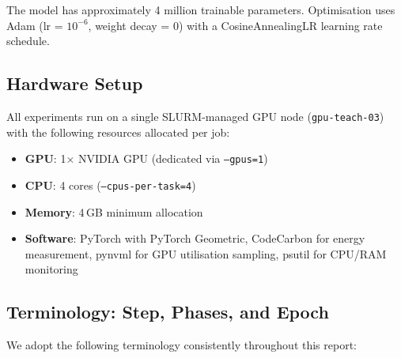 \documentclass[10pt,twocolumn]{article}
\begin{document}
The model has approximately 4 million trainable parameters. Optimisation uses Adam (lr = $10^{-6}$, weight decay = 0) with a CosineAnnealingLR learning rate schedule.

\subsection{Hardware Setup}

All experiments run on a single SLURM-managed GPU node (\texttt{gpu-teach-03}) with the following resources allocated per job:
\begin{itemize}[nosep]
    \item \textbf{GPU}: 1$\times$ NVIDIA GPU (dedicated via \texttt{--gpus=1})
    \item \textbf{CPU}: 4 cores (\texttt{--cpus-per-task=4})
    \item \textbf{Memory}: 4\,GB minimum allocation
    \item \textbf{Software}: PyTorch with PyTorch Geometric, CodeCarbon for energy measurement, pynvml for GPU utilisation sampling, psutil for CPU/RAM monitoring
\end{itemize}

\subsection{Terminology: Step, Phases, and Epoch}

We adopt the following terminology consistently throughout this report:
\end{document}
